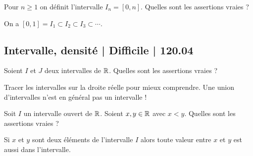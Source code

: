 \begin{question}
Pour $n\ge 1$ on définit l'intervalle $I_n = [0,n]$. 
Quelles sont les assertions vraies ?
\begin{answers}


    \good{L'union de tous les $I_n$ (pour $n$ parcourant $\Nn^*$) est $[0,+\infty[$.}

\end{answers}
\begin{explanations}
On a $[0,1] = I_1 \subset I_2 \subset I_3 \subset \cdots$.
\end{explanations}
\end{question}

\subsection{Intervalle, densité | Difficile | 120.04}


\begin{question}
Soient $I$ et $J$ deux intervalles de $\mathbb{R}$. Quelles sont les assertions vraies ?
\begin{answers}



\end{answers}
\begin{explanations}
Tracer les intervalles sur la droite réelle pour mieux comprendre.
Une union d'intervalles n'est en général pas un intervalle !
\end{explanations}
\end{question}


\begin{question}
Soit $I$ un intervalle ouvert de $\mathbb{R}$. Soient $x,y \in\mathbb{R}$ avec $x < y$.
Quelles sont les assertions vraies ?
\begin{answers}



\end{answers}
\begin{explanations}
Si $x$ et $y$ sont deux éléments de l'intervalle $I$ alors toute valeur entre $x$ et $y$ est aussi dans l'intervalle.
\end{explanations}
\end{question}





